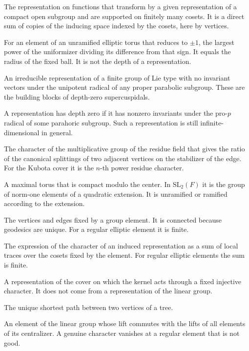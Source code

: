 \documentclass[12pt,letterpaper]{article}
\numberwithin{equation}{section}
\theoremstyle{definition}
\theoremstyle{remark}
\begin{document}
\begin{description}[style=nextline,leftmargin=1.5em]
\item[Compact induction] The representation on functions that transform by a given representation of a compact open subgroup and are supported on finitely many cosets. It is a direct sum of copies of the inducing space indexed by the cosets, here by vertices.
\item[Congruence depth] For an element of an unramified elliptic torus that reduces to $\pm1$, the largest power of the uniformizer dividing its difference from that sign. It equals the radius of the fixed ball. It is not the depth of a representation.
\item[Cuspidal finite representation] An irreducible representation of a finite group of Lie type with no invariant vectors under the unipotent radical of any proper parabolic subgroup. These are the building blocks of depth-zero supercuspidals.
\item[Depth zero] A representation has depth zero if it has nonzero invariants under the pro-$p$ radical of some parahoric subgroup. Such a representation is still infinite-dimensional in general.
\item[Edge character] The character of the multiplicative group of the residue field that gives the ratio of the canonical splittings of two adjacent vertices on the stabilizer of the edge. For the Kubota cover it is the $n$-th power residue character.
\item[Elliptic torus] A maximal torus that is compact modulo the center. In $\mathrm{SL}_2(F)$ it is the group of norm-one elements of a quadratic extension. It is unramified or ramified according to the extension.
\item[Fixed subtree] The vertices and edges fixed by a group element. It is connected because geodesics are unique. For a regular elliptic element it is finite.
\item[Frobenius character formula] The expression of the character of an induced representation as a sum of local traces over the cosets fixed by the element. For regular elliptic elements the sum is finite.
\item[Genuine representation] A representation of the cover on which the kernel acts through a fixed injective character. It does not come from a representation of the linear group.
\item[Geodesic] The unique shortest path between two vertices of a tree.
\item[Good element] An element of the linear group whose lift commutes with the lifts of all elements of its centralizer. A genuine character vanishes at a regular element that is not good.

\end{description}
\end{document}
